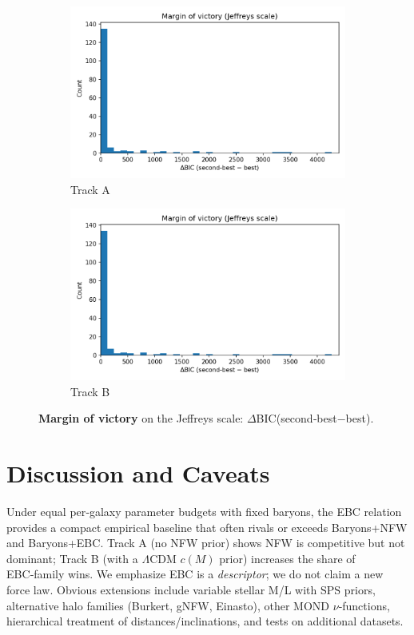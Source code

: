 \documentclass[12pt]{article}
\begin{document}
\begin{figure}[H]
  \centering
  \begin{subfigure}{0.48\linewidth}
    \centering\includegraphics[width=\linewidth]{figs_trackA_dense/margin_of_victory_hist.png}
    \caption{Track A}
  \end{subfigure}\hfill
  \begin{subfigure}{0.48\linewidth}
    \centering\includegraphics[width=\linewidth]{figs_trackB_dense/margin_of_victory_hist.png}
    \caption{Track B}
  \end{subfigure}
  \caption{\textbf{Margin of victory} on the Jeffreys scale: $\Delta$BIC(second‑best$-$best).}
  \label{fig:margin}
\end{figure}

\section{Discussion and Caveats}
Under equal per‑galaxy parameter budgets with fixed baryons, the EBC relation provides a compact empirical baseline that often rivals or exceeds Baryons+NFW and Baryons+EBC. Track A (no NFW prior) shows NFW is competitive but not dominant; Track B (with a $\Lambda$CDM $c(M)$ prior) increases the share of EBC‑family wins. We emphasize EBC is a \emph{descriptor}; we do not claim a new force law. Obvious extensions include variable stellar M/L with SPS priors, alternative halo families (Burkert, gNFW, Einasto), other MOND $\nu$‑functions, hierarchical treatment of distances/inclinations, and tests on additional datasets.
\end{document}
